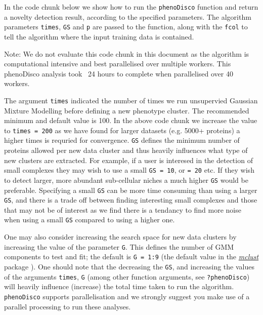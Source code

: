 In the code chunk below we show how to run the \texttt{phenoDisco}
function and return a novelty detection result, according to the
specified parameters. The algorithm parameters \texttt{times}, \texttt{GS} and \texttt{p}
are passed to the function, along with the \texttt{fcol} to tell the
algorithm where the input training data is contained. 

\begin{knitrout}
\color{fgcolor}\begin{kframe}
\begin{alltt}
 \hlkwb{<-}   \hlstd{=} \hlstd{,}  \hlstd{=} \hlstd{,}  \hlstd{=} \hlstd{)}
\end{alltt}
\end{kframe}
\end{knitrout}

Note: We do not evaluate this code chunk in this document as the
algorithm is computational intensive and best parallelised over
multiple workers. This phenoDisco analysis took ~24 hours to complete
when parallelised over 40 workers.

The argument \texttt{times} indicated the number of times we run
unsupervied Gaussian Mixture Modelling before defining a new phenotype
cluster.  The recommended minimum and default value is 100. In the
above code chunk we increase the value to \texttt{times = 200} as we
have found for larger datasets (e.g. 5000+ proteins) a higher times is
requried for convergence. \texttt{GS} defines the minimum number of
proteins allowed per new data cluster and thus heavily influences what
type of new clusters are extracted. For example, if a user is
interesed in the detection of small complexes they may wish to use a
small \texttt{GS = 10}, or \texttt{= 20} etc.  If they wish to detect
larger, more abundant sub-cellular niches a much higher \texttt{GS}
would be preferable. Specifying a small \texttt{GS} can be more time
consuming than using a larger \texttt{GS}, and there is a trade off
between finding interesting small complexes and those that may not be
of interest as we find there is a tendancy to find more noise when
using a small \texttt{GS} compared to using a higher one.

One may also consider increasing the search space for new data
clusters by increasing the value of the parameter \texttt{G}. This
defines the number of GMM components to test and fit; the default is
\texttt{G = 1:9} (the default value in the
\href{https://cran.r-project.org/web/packages/mclust/index.html}{\textit{mclust}}
package \cite{mclust}). One should note that the decreasing the
\texttt{GS}, and increasing the values of the arguments
\texttt{times}, \texttt{G} (among other function arguments, see
\texttt{?phenoDisco}) will heavily influence (increase) the total time
taken to run the algorithm.  \texttt{phenoDisco} supports
parallelisation and we strongly suggest you make use of a parallel
processing to run these analyses.



